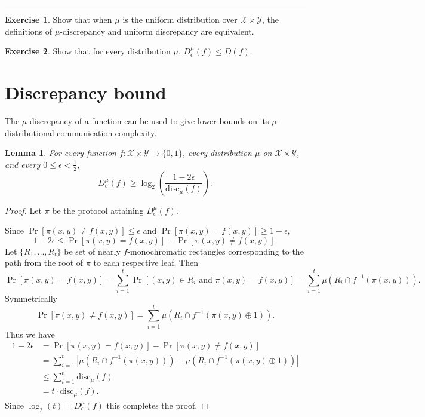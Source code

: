 \documentclass[11pt]{amsart}
\theoremstyle{plain}
\newtheorem{lemma}{Lemma}
\theoremstyle{definition}
\newtheorem{exercise}{Exercise}
\theoremstyle{plain}
\newcommand{\calX}{\mathcal{X}}
\newcommand{\calY}{\mathcal{Y}}
\newcommand{\disc}{\mathrm{disc}}
\newcommand{\exercises}{\bigskip \noindent\rule{8cm}{0.4pt} \medskip}
\begin{document}
\exercises

\begin{exercise}
Show that when $\mu$ is the uniform distribution over $\calX \times \calY$, the definitions of $\mu$-discrepancy and uniform discrepancy are equivalent.
\end{exercise}

\begin{exercise}
Show that for every distribution $\mu$, $D^\mu_\epsilon(f) \le D(f)$.
\end{exercise}


\newpage \section{Discrepancy bound}

The $\mu$-discrepancy of a function can be used to give lower bounds on its $\mu$-distributional communication complexity.

\begin{lemma}
For every function $f : \calX \times \calY \to \{0,1\}$, every distribution $\mu$ on $\calX \times \calY$, and every $0 \le \epsilon < \frac12$,
\[
D_\epsilon^{\mu}(f) \ge \log_2 \left( \frac{1-2\epsilon}{\disc_\mu(f)} \right).
\]
\end{lemma}

\begin{proof}
Let $\pi$ be the protocol attaining $D_\epsilon^{\mu}(f)$. 

Since $\Pr[\pi(x,y) \neq f(x,y)] \leq \epsilon$ and $\Pr[\pi(x,y) = f(x,y)] \geq 1-\epsilon$,
$$1-2\epsilon \leq \Pr[\pi(x,y) = f(x,y)] - \Pr[\pi(x,y) \neq f(x,y)].$$
Let $\{R_1, \dots, R_t\}$ be set of nearly $f$-monochromatic rectangles corresponding to the path from the root of $\pi$ to each respective leaf. Then
$$\Pr[\pi(x,y) = f(x,y)] = \sum_{i=1}^t \Pr[(x,y) \in R_i \text{ and }\pi(x,y) = f(x,y) ] = \sum_{i=1}^t \mu(R_i \cap f^{-1}(\pi(x,y))).$$
Symmetrically
$$\Pr[\pi(x,y) \neq f(x,y)] = \sum_{i=1}^t\mu(R_i \cap f^{-1}(\pi(x,y)\oplus 1)).$$
Thus we have
\begin{align*}1-2\epsilon &= \Pr[\pi(x,y) = f(x,y)] - \Pr[\pi(x,y) \neq f(x,y)] \\
&=\sum_{i=1}^t|\mu(R_i\cap f^{-1}(\pi(x,y))) -\mu(R_i \cap f^{-1}(\pi(x,y)\oplus 1))| \\
&\leq \sum_{i=1}^t \disc_\mu(f)\\
&= t\cdot\disc_\mu(f).\end{align*}
Since $\log_2(t) = D_\epsilon^{\mu}(f)$ this completes the proof.
\end{proof}
\end{document}
